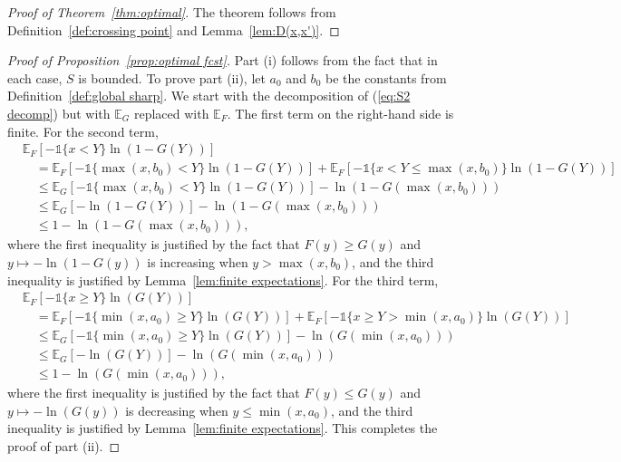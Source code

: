 \documentclass[10pt]{article} %
\theoremstyle{theorem}
\theoremstyle{definition}
\newcommand{\EEE}{\mathbb{E}}
\newcommand{\one}{\mathds{1}}
\begin{document}
\begin{proof}[Proof of Theorem~\ref{thm:optimal}]
The theorem follows from Definition~\ref{def:crossing point} and Lemma~\ref{lem:D(x,x')}.
\end{proof}

\begin{proof}[Proof of Proposition~\ref{prop:optimal fcst}]
Part (i) follows from the fact that in each case, $S$ is bounded. To prove part (ii), let $a_0$ and $b_0$ be the constants from Definition~\ref{def:global sharp}. We start with the decomposition of (\ref{eq:S2 decomp}) but with $\EEE_G$ replaced with $\EEE_F$. The first term on the right-hand side is finite. For the second term,
\begin{align*}
&\EEE_F[-\one\{x < Y\}\ln(1-G(Y))] \\
&\quad= \EEE_F[-\one\{\max(x,b_0) < Y\}\ln(1-G(Y))] + \EEE_F[-\one\{x < Y \leq \max(x,b_0)\}\ln(1-G(Y))] \\
&\quad\leq \EEE_G[-\one\{\max(x,b_0) < Y\}\ln(1-G(Y))] - \ln(1-G(\max(x,b_0))) \\
&\quad\leq \EEE_G[-\ln(1-G(Y))] - \ln(1-G(\max(x,b_0))) \\
&\quad\leq 1- \ln(1-G(\max(x,b_0))),
\end{align*}
where the first inequality is justified by the fact that $F(y)\geq G(y)$ and $y\mapsto -\ln(1-G(y))$ is increasing when $y > \max(x,b_0)$, and the third inequality is justified by Lemma~\ref{lem:finite expectations}. For the third term,
\begin{align*}
&\EEE_F[-\one\{x \geq Y\}\ln(G(Y))] \\
&\quad= \EEE_F[-\one\{\min(x,a_0) \geq Y\}\ln(G(Y))] + \EEE_F[-\one\{x \geq Y > \min(x,a_0)\}\ln(G(Y))] \\
&\quad\leq \EEE_G[-\one\{\min(x,a_0) \geq Y\}\ln(G(Y))] - \ln(G(\min(x,a_0))) \\
&\quad\leq \EEE_G[-\ln(G(Y))] -  \ln(G(\min(x,a_0))) \\
&\quad\leq 1- \ln(G(\min(x,a_0))),
\end{align*}
where the first inequality is justified by the fact that $F(y)\leq G(y)$ and $y\mapsto -\ln(G(y))$ is decreasing when $y\leq \min(x,a_0)$, and the third inequality is justified by Lemma~\ref{lem:finite expectations}. This completes the proof of part (ii).
\end{proof}
\end{document}
